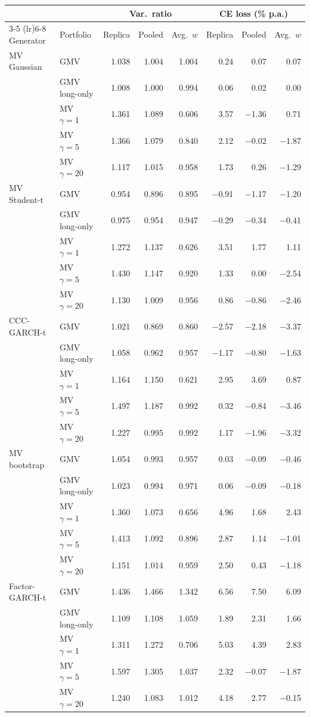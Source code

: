 \begin{tabular}{llrrrrrr}
\toprule
 &  & \multicolumn{3}{c}{Var.\ ratio} & \multicolumn{3}{c}{CE loss (\% p.a.)} \\
\cmidrule(lr){3-5} \cmidrule(lr){6-8}
Generator & Portfolio & Replica & Pooled & Avg.\ $w$ & Replica & Pooled & Avg.\ $w$ \\
\midrule
MV Gaussian & GMV & 1.038 & 1.004 & 1.004 & 0.24 & 0.07 & 0.07 \\
 & GMV long-only & 1.008 & 1.000 & 0.994 & 0.06 & 0.02 & 0.00 \\
 & MV $\gamma=1$ & 1.361 & 1.089 & 0.606 & 3.57 & $-$1.36 & 0.71 \\
 & MV $\gamma=5$ & 1.366 & 1.079 & 0.840 & 2.12 & $-$0.02 & $-$1.87 \\
 & MV $\gamma=20$ & 1.117 & 1.015 & 0.958 & 1.73 & 0.26 & $-$1.29 \\
MV Student-t & GMV & 0.954 & 0.896 & 0.895 & $-$0.91 & $-$1.17 & $-$1.20 \\
 & GMV long-only & 0.975 & 0.954 & 0.947 & $-$0.29 & $-$0.34 & $-$0.41 \\
 & MV $\gamma=1$ & 1.272 & 1.137 & 0.626 & 3.51 & 1.77 & 1.11 \\
 & MV $\gamma=5$ & 1.430 & 1.147 & 0.920 & 1.33 & 0.00 & $-$2.54 \\
 & MV $\gamma=20$ & 1.130 & 1.009 & 0.956 & 0.86 & $-$0.86 & $-$2.46 \\
CCC-GARCH-t & GMV & 1.021 & 0.869 & 0.860 & $-$2.57 & $-$2.18 & $-$3.37 \\
 & GMV long-only & 1.058 & 0.962 & 0.957 & $-$1.17 & $-$0.80 & $-$1.63 \\
 & MV $\gamma=1$ & 1.164 & 1.150 & 0.621 & 2.95 & 3.69 & 0.87 \\
 & MV $\gamma=5$ & 1.497 & 1.187 & 0.992 & 0.32 & $-$0.84 & $-$3.46 \\
 & MV $\gamma=20$ & 1.227 & 0.995 & 0.992 & 1.17 & $-$1.96 & $-$3.32 \\
MV bootstrap & GMV & 1.054 & 0.993 & 0.957 & 0.03 & $-$0.09 & $-$0.46 \\
 & GMV long-only & 1.023 & 0.994 & 0.971 & 0.06 & $-$0.09 & $-$0.18 \\
 & MV $\gamma=1$ & 1.360 & 1.073 & 0.656 & 4.96 & 1.68 & 2.43 \\
 & MV $\gamma=5$ & 1.413 & 1.092 & 0.896 & 2.87 & 1.14 & $-$1.01 \\
 & MV $\gamma=20$ & 1.151 & 1.014 & 0.959 & 2.50 & 0.43 & $-$1.18 \\
Factor-GARCH-t & GMV & 1.436 & 1.466 & 1.342 & 6.56 & 7.50 & 6.09 \\
 & GMV long-only & 1.109 & 1.108 & 1.059 & 1.89 & 2.31 & 1.66 \\
 & MV $\gamma=1$ & 1.311 & 1.272 & 0.706 & 5.03 & 4.39 & 2.83 \\
 & MV $\gamma=5$ & 1.597 & 1.305 & 1.037 & 2.32 & $-$0.07 & $-$1.87 \\
 & MV $\gamma=20$ & 1.240 & 1.083 & 1.012 & 4.18 & 2.77 & $-$0.15 \\
\bottomrule
\end{tabular}
